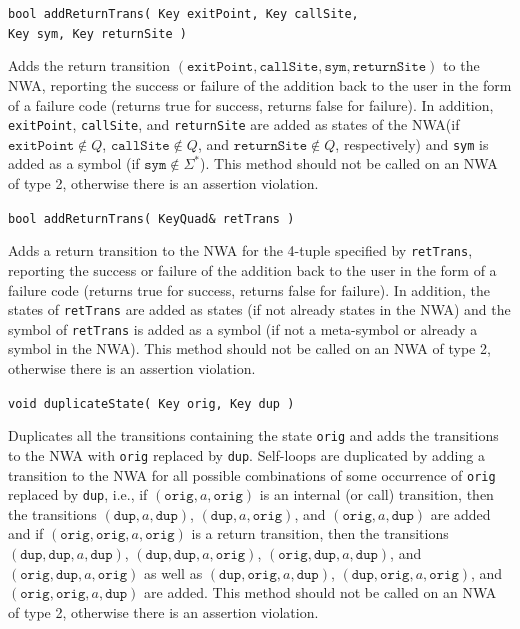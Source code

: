 \documentclass{llncs}
\begin{document}
\begin{description}
  \item\texttt{bool addReturnTrans( Key exitPoint, Key callSite,\\ \hspace*{3.25cm} Key sym, Key returnSite )}

    Adds the return transition $(\texttt{exitPoint},\texttt{callSite},\texttt{sym},\texttt{returnSite})$ to the NWA, reporting the success or failure of the addition back to the user in the form of a failure code (returns true for success, returns false for failure).  In addition, \texttt{exitPoint}, \texttt{callSite}, and \texttt{returnSite} are added as states of the NWA(if $\texttt{exitPoint} \not\in Q$, $\texttt{callSite} \not\in Q$, and $\texttt{returnSite} \not\in Q$, respectively) and \texttt{sym} is added as a symbol (if $\texttt{sym} \not\in \Sigma^*$).  This method should not be called on an NWA of type 2, otherwise there is an assertion violation.

  \item\texttt{bool addReturnTrans( KeyQuad\& retTrans )}

    Adds a return transition to the NWA for the 4-tuple specified by \texttt{retTrans}, reporting the success or failure of the addition back to the user in the form of a failure code (returns true for success, returns false for failure).  In addition, the states of \texttt{retTrans} are added as states (if not already states in the NWA) and the symbol of \texttt{retTrans} is added as a symbol (if not a meta-symbol or already a symbol in the NWA).  This method should not be called on an NWA of type 2, otherwise there is an assertion violation.

  \item\texttt{void duplicateState( Key orig, Key dup )}

    Duplicates all the transitions containing the state \texttt{orig} and adds the transitions to the NWA with \texttt{orig} replaced by \texttt{dup}.  Self-loops are duplicated by adding a transition to the NWA for all possible combinations of some occurrence of \texttt{orig} replaced by \texttt{dup}, i.e., if $(\texttt{orig},a,\texttt{orig})$ is an internal (or call) transition, then the transitions $(\texttt{dup},a,\texttt{dup})$, $(\texttt{dup},a,\texttt{orig})$, and $(\texttt{orig},a,\texttt{dup})$ are added and if $(\texttt{orig},\texttt{orig},a,\texttt{orig})$ is a return transition, then the transitions $(\texttt{dup},\texttt{dup},a,\texttt{dup})$, $(\texttt{dup},\texttt{dup},a,\texttt{orig})$,  $(\texttt{orig},\texttt{dup},a,\texttt{dup})$, and $(\texttt{orig},\texttt{dup},a,\texttt{orig})$ as well as $(\texttt{dup},\texttt{orig},a,\texttt{dup})$, $(\texttt{dup},\texttt{orig},a,\texttt{orig})$, and $(\texttt{orig},\texttt{orig},a,\texttt{dup})$ are added.  This method should not be called on an NWA of type 2, otherwise there is an assertion violation.


\end{description}
\end{document}

